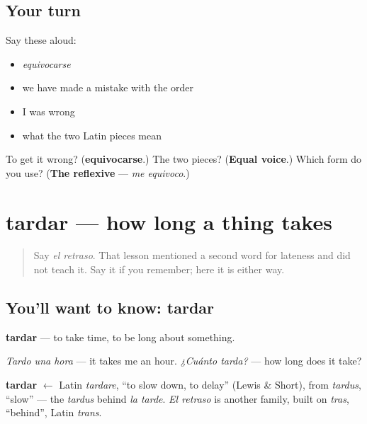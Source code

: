 \subsection*{Your turn}
Say these aloud:

\begin{itemize}
\raggedright
  \item \emph{equivocarse}
  \item we have made a mistake with the order
  \item I was wrong
  \item what the two Latin pieces mean
\end{itemize}

\begin{tcolorbox}[breakable,colback=teal!4,colframe=teal!35!black,title={Before you move on}]
To get it wrong? (\textbf{equivocarse}.) The two pieces? (\textbf{Equal voice}.) Which form do you use? (\textbf{The reflexive} — \emph{me equivoco}.)
\end{tcolorbox}
\section[tardar]{tardar — how long a thing takes}

\label{lesson:ES-C437-tardar}



\begin{quote}
Say \emph{el retraso}. That lesson mentioned a second word for lateness and did not teach it. Say it if you remember; here it is either way.
\end{quote}

\subsection*{You'll want to know: tardar}
\textbf{tardar} — to take time, to be long about something.

\emph{Tardo una hora} — it takes me an hour. \emph{¿Cuánto tarda?} — how long does it take?

\begin{cousinweb}
\textbf{tardar} $\leftarrow$ Latin \emph{tardare}, \textquotedblleft{}to slow down, to delay\textquotedblright{} (Lewis \& Short), from \emph{tardus}, \textquotedblleft{}slow\textquotedblright{} — the \emph{tardus} behind \emph{la tarde}. \emph{El retraso} is another family, built on \emph{tras}, \textquotedblleft{}behind\textquotedblright{}, Latin \emph{trans}.
\end{cousinweb}

